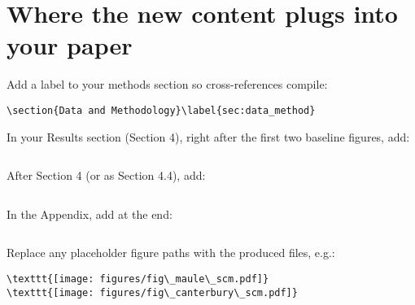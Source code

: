 \section{Where the new content plugs into your paper}

Add a label to your methods section so cross-references compile:
\begin{verbatim}
\section{Data and Methodology}\label{sec:data_method}
\end{verbatim}

In your Results section (Section 4), right after the first two baseline figures, add:
\begin{verbatim}

\end{verbatim}

After Section 4 (or as Section 4.4), add:
\begin{verbatim}

\end{verbatim}

In the Appendix, add at the end:
\begin{verbatim}

\end{verbatim}

Replace any placeholder figure paths with the produced files, e.g.:
\begin{verbatim}
\texttt{[image: figures/fig\_maule\_scm.pdf]}
\texttt{[image: figures/fig\_canterbury\_scm.pdf]}
\end{verbatim}
